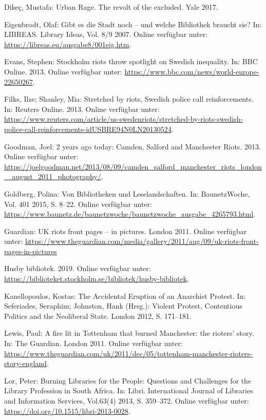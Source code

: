 \documentclass[a4paper,
fontsize=11pt,
oneside,
numbers=noperiodatend,
parskip=half-,
bibliography=totoc,
final
]{scrartcl}
\begin{document}
Dikeç, Mustafa: Urban Rage. The revolt of the excluded. Yale 2017.

Eigenbrodt, Olaf: Gibt es die Stadt noch -- und welche Bibliothek
braucht sie? In: LIBREAS. Library Ideas, Vol. 8/9 2007. Online verfügbar
unter: \url{https://libreas.eu/ausgabe8/001eig.htm}.

Evans, Stephen: Stockholm riots throw spotlight on Swedish inequality.
In: BBC Online. 2013. Online verfügbar unter:
\url{https://www.bbc.com/news/world-europe-22650267}.

Filks, Ilze; Shanley, Mia: Stretched by riots, Swedish police call
reinforcements. In: Reuters Online. 2013. Online verfügbar unter:
\url{https://www.reuters.com/article/us-swedenriots/stretched-by-riots-swedish-police-call-reinforcements-idUSBRE94N0LN20130524}.

Goodman, Joel: 2 years ago today: Camden, Salford and Manchester Riots.
2013. Online verfügbar unter:
\href{https://joelgoodman.net/2013/08/09/camden_salford_manchester_riots_london_august_2011_photography/}{https://joelgoodman.net/2013/08/09/camden\_salford\_manchester\_riots\_london\_ august\_2011\_photography/}.

Goldberg, Polina: Von Bibliotheken und Leselandschaften. In:
BaunetzWoche, Vol. 401 2015, S. 8--22. Online verfügbar unter:
\url{https://www.baunetz.de/baunetzwoche/baunetzwoche_ausgabe_4265793.html}.

Guardian: UK riots front pages -- in pictures. London 2011. Online
verfügbar unter: \newline
\url{https://www.theguardian.com/media/gallery/2011/aug/09/uk-riots-front-pages-in-pictures}

Husby bibliotek. 2019. Online verfügbar unter:
\url{https://biblioteket.stockholm.se/bibliotek/husby-bibliotek}.

Kanellopoulos, Kostas: The Accidental Eruption of an Anarchist Protest.
In: Seferiades, Seraphim; Johnston, Hank (Hrsg.): Violent Protest,
Contentious Politics and the Neoliberal State. London 2012, S. 171--181.

Lewis, Paul: A fire lit in Tottenham that burned Manchester: the
rioters' story. In: The Guardian. London 2011. Online verfügbar unter:
\url{https://www.theguardian.com/uk/2011/dec/05/tottenham-manchester-rioters-story-england}.

Lor, Peter: Burning Libraries for the People: Questions and Challenges
for the Library Profession in South Africa. In: Libri. International
Journal of Libraries and Information Services, Vol.63(4) 2013, S.
359--372. Online verfügbar unter:
\url{https://doi.org/10.1515/libri-2013-0028}.
\end{document}
